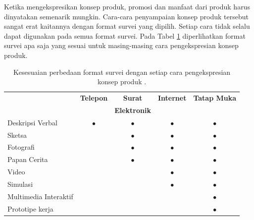 Ketika mengekspresikan konsep produk, promosi dan manfaat dari produk harus dinyatakan semenarik mungkin. Cara-cara penyampaian konsep produk tersebut sangat erat kaitannya dengan format survei yang dipilih. Setiap cara tidak selalu dapat digunakan pada semua format survei. Pada Tabel \ref{tab:bedaCara-bedaFormat} diperlihatkan format survei apa saja yang sesuai untuk masing-masing cara pengekspresian konsep produk. \par 
\begin{table}[t!]
    \centering
    \caption{Kesesuaian perbedaan format survei dengan setiap cara pengekspresian konsep produk \cite{bukuUlrich}.}
    \begin{tabular}{m{4cm} c c c c}
        \hline
        \textbf{}& \textbf{Telepon} & \textbf{Surat} & \textbf{Internet} & \textbf{Tatap Muka}\\
        & & \textbf{Elektronik} & \\
        \hline
        Deskripsi Verbal & $\bullet$ & $\bullet$ & $\bullet$ & $\bullet$ \\
        Sketsa & & $\bullet$ & $\bullet$ & $\bullet$ \\
        Fotografi & & $\bullet$ & $\bullet$ & $\bullet$ \\
        Papan Cerita & & $\bullet$ & $\bullet$ & $\bullet$ \\
        Video & & & $\bullet$ & $\bullet$ \\
        Simulasi & & & $\bullet$ & $\bullet$ \\
        Multimedia Interaktif & & &  & $\bullet$ \\
        Prototipe kerja & & &  & $\bullet$ \\
        \hline
    \end{tabular}
    \label{tab:bedaCara-bedaFormat}
\end{table}

